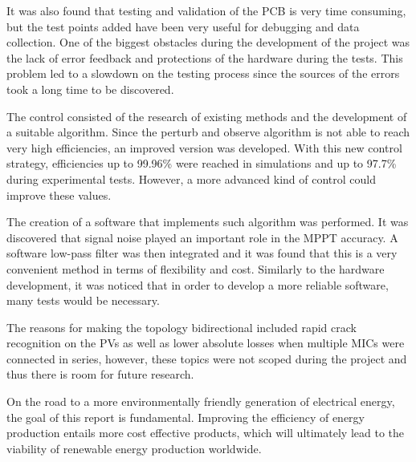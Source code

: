 It was also found that testing and validation of the PCB is very time consuming, but the test points added have been very useful for debugging and data collection. 
One of the biggest obstacles during the development of the project was the lack of error feedback and protections of the hardware during the tests. This problem led to a slowdown on the testing process since the sources of the errors took a long time to be discovered. 

The control consisted of the research of existing methods and the development of a suitable algorithm. Since the perturb and observe algorithm is not able to reach very high efficiencies, an improved version was developed. With this new control strategy, efficiencies up to 99.96\% were reached in simulations and up to 97.7\% during experimental tests. However, a more advanced kind of control could improve these values.

The creation of a software that implements such algorithm was performed. It was discovered that signal noise played an important role in the MPPT accuracy. A software low-pass filter was then integrated and it was found that this is a very convenient method in terms of flexibility and cost. 
Similarly to the hardware development, it was noticed that in order to develop a more reliable software, many tests would be necessary.

The reasons for making the topology bidirectional included rapid crack recognition on the PVs as well as lower absolute losses when multiple MICs were connected in series, however, these topics were not scoped during the project and thus there is room for future research.

On the road to a more environmentally friendly generation of electrical energy, the goal of this report is fundamental. Improving the efficiency of energy production entails more cost effective products, which will ultimately lead to the viability of renewable energy production worldwide.